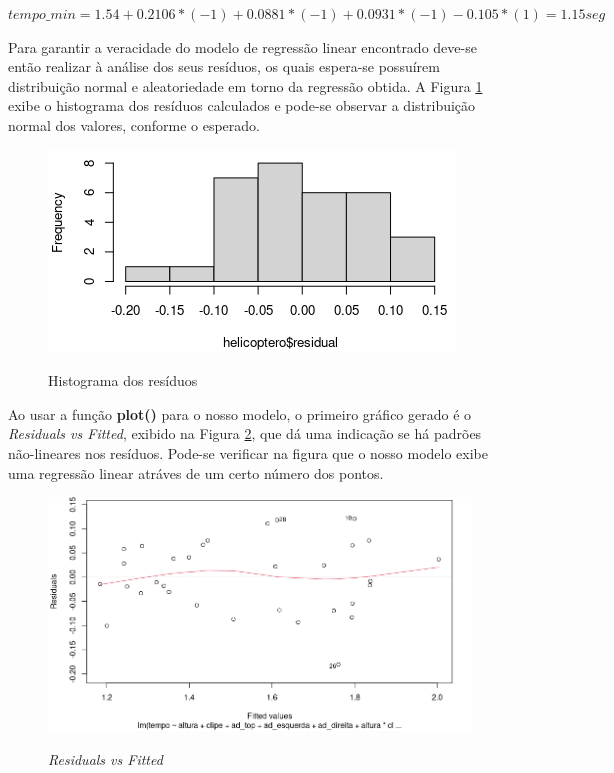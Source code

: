   $tempo\_min =  1.54 + 0.2106*(-1) + 0.0881*(-1) + 0.0931*(-1) - 0.105*(1) = 1.15seg$

Para garantir a veracidade do modelo de regressão linear encontrado deve-se então realizar à análise dos seus resíduos, os quais espera-se possuírem distribuição normal e aleatoriedade em torno da regressão obtida.  A Figura \ref{fig:hist_residuals} exibe o histograma dos resíduos calculados e pode-se observar a distribuição normal dos valores, conforme o esperado.

\begin{figure}[H]
  \caption{Histograma dos resíduos}
  \center
  \includegraphics[scale=0.7]{images/hist_residuals.png}
  \label{fig:hist_residuals}
\end{figure}

Ao usar a função \textbf{plot()} para o nosso modelo, o primeiro gráfico gerado é o \textit{Residuals vs Fitted}, exibido na Figura \ref{fig:fitted}, que dá uma indicação se há padrões não-lineares nos resíduos. Pode-se verificar na figura que o nosso modelo exibe uma regressão linear atráves de um certo número dos pontos.

\begin{figure}[H]
\caption{\textit{Residuals vs Fitted}}
\center 
\includegraphics[scale=0.42]{images/fitted.png}
\label{fig:fitted}
\end{figure}

